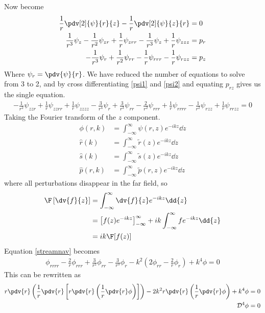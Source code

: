 \documentclass[12pt]{article}
\begin{document}
Now  become
\begin{align}
\frac{1}{r}\pdv[2]{\psi}{r}{z}-\frac{1}{r}\pdv[2]{\psi}{z}{r}&=0\\
\frac{1}{r^3}\psi_{z}-\frac{1}{r^2}\psi_{zr}+\frac{1}{r}\psi_{zrr}-\frac{1}{r^3}\psi_z +\frac{1}{r}\psi_{zzz}&=p_r\label{psi1}\\
-\frac{1}{r^3}\psi_{r}+\frac{1}{r^2}\psi_{rr}-\frac{1}{r}\psi_{rrr}-\frac{1}{r}\psi_{rzz}&=p_z\label{psi2}
\end{align}
Where $\psi_r=\pdv{\psi}{r}$. We have reduced the number of equations to solve from 3 to 2, and by cross differentiating \eqref{psi1} and \eqref{psi2} and equating $p_{rz}$ gives us the single equation.
\small
\begin{align}
-{\frac{1}{r^2}\psi_{zzr}}+{\frac{1}{r}\psi_{zzrr}}+\frac{1}{r}\psi_{zzzz}-\frac{3}{r^4}\psi_r+\frac{3}{r^3}\psi_{rr}-\frac{2}{r^2}\psi_{rrr}+\frac{1}{r}\psi_{rrrr}-\frac{1}{r^2}\psi_{rzz}+\frac{1}{r}\psi_{rrzz}=0 \label{streamnav}
\end{align}
\normalsize
Taking the Fourier transform of the $z$ component.
\begin{align}
\phi(r,k)&=\int_{-\infty}^{\infty}\psi(r,z)e^{-ikz}\dd{z}\\
\hat r(k)&=\int_{-\infty}^{\infty}\tilde r(z)e^{-ikz}\dd{z}\\
\hat s(k)&=\int_{-\infty}^{\infty}\tilde s(z)e^{-ikz}\dd{z}\\
\hat p(r,k)&=\int_{-\infty}^{\infty}\tilde p(r,z)e^{-ikz}\dd{z}
\end{align}
where all perturbations disappear in the far field, so 
\begin{align}
\F\left[\dv{f}{z}\right]&=\int_{-\infty}^{\infty}\dv{f}{z}e^{-ikz}\dd{z}\\
&=\left[f(z)e^{-ikz}\right]^\infty_{-\infty} +ik\int_{-\infty}^{\infty}fe^{-ikz}\dd{z}\\
&=ik\F[f(z)]
\end{align}
Equation \eqref{streamnav} becomes
\begin{align}
\phi_{rrrr}-\frac{2}{r}\phi_{rrr}+\frac{3}{r^2}\phi_{rr}-\frac{3}{r^3}\phi_r-k^2\left(2\phi_{rr}-\frac{2}{r}\phi_{r}\right)+k^4\phi=0\label{phiclose}
\end{align}
This can be rewritten as 
\begin{align}
r\pdv{r}\left(\frac{1}{r}\pdv{r}\left[r\pdv{r}\left(\frac{1}{r}\pdv{r}\phi\right)\right]\right)-2k^2r\pdv{r}\left(\frac{1}{r}\pdv{r}\phi\right)+k^4\phi&=0\\
\mathcal{D}^4\phi&=0
\end{align}
\end{document}

